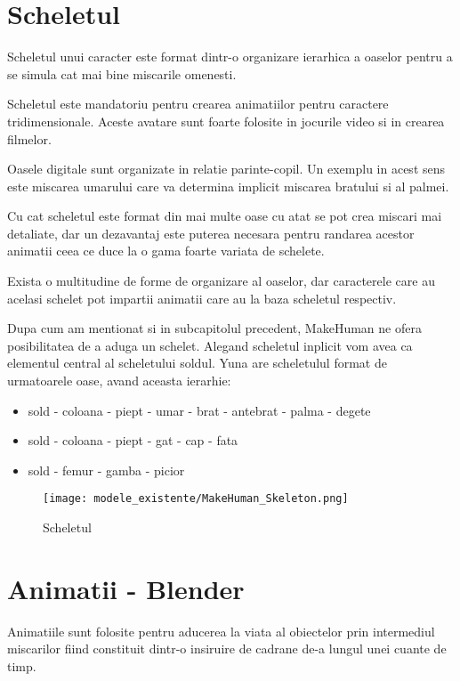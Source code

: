\documentclass[12pt,a4paper]{report}
\begin{document}
\section{Scheletul}
Scheletul unui caracter este format dintr-o organizare ierarhica a oaselor pentru a se simula cat mai bine miscarile omenesti.

Scheletul este mandatoriu pentru crearea animatiilor pentru caractere tridimensionale. Aceste avatare sunt foarte folosite in jocurile video si in crearea filmelor.

Oasele digitale sunt organizate in relatie parinte-copil. Un exemplu in acest sens este miscarea umarului care va determina implicit miscarea bratului si al palmei.

Cu cat scheletul este format din mai multe oase cu atat se pot crea miscari mai detaliate, dar un dezavantaj este puterea necesara pentru randarea acestor animatii ceea ce duce la o gama foarte variata de schelete.

Exista o multitudine de forme de organizare al oaselor, dar caracterele care au acelasi schelet pot impartii animatii care au la baza scheletul respectiv.

Dupa cum am mentionat si in subcapitolul precedent, MakeHuman ne ofera posibilitatea de a aduga un schelet. Alegand scheletul inplicit vom avea ca elementul central al scheletului soldul. Yuna are scheletulul format de urmatoarele oase, avand aceasta ierarhie:

\begin{itemize}[noitemsep,topsep=0pt]
    \item sold - coloana - piept - umar - brat - antebrat - palma - degete
    \item sold - coloana - piept - gat - cap - fata
    \item sold - femur - gamba - picior
\end{itemize}

\begin{figure}[th]
\centering
\texttt{[image: modele\_existente/MakeHuman\_Skeleton.png]}
  \caption[Scheletul]{Scheletul\protect\footnotemark}
  \label{figure_1:picture_10}
\end{figure}


\section{Animatii - Blender}

Animatiile sunt folosite pentru aducerea la viata al obiectelor prin intermediul miscarilor fiind constituit dintr-o insiruire de cadrane de-a lungul unei cuante de timp. 
\end{document}
